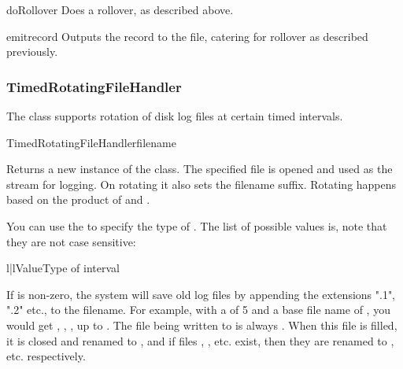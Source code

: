 \begin{methoddesc}{doRollover}{}
Does a rollover, as described above.
\end{methoddesc}

\begin{methoddesc}{emit}{record}
Outputs the record to the file, catering for rollover as described previously.
\end{methoddesc}

\subsubsection{TimedRotatingFileHandler}

The  class supports rotation of disk log files
at certain timed intervals.

\begin{classdesc}{TimedRotatingFileHandler}{filename
                                            }

Returns a new instance of the  class. The
specified file is opened and used as the stream for logging. On rotating
it also sets the filename suffix. Rotating happens based on the product
of  and .

You can use the  to specify the type of . The
list of possible values is, note that they are not case sensitive:

\begin{tableii}{l|l}{}{Value}{Type of interval}
\end{tableii}

If  is non-zero, the system will save old log files by
appending the extensions ".1", ".2" etc., to the filename. For example,
with a  of 5 and a base file name of ,
you would get , , , up to
. The file being written to is always .
When this file is filled, it is closed and renamed to ,
and if files , , etc. exist, then they
are renamed to ,  etc. respectively.
\end{classdesc}

